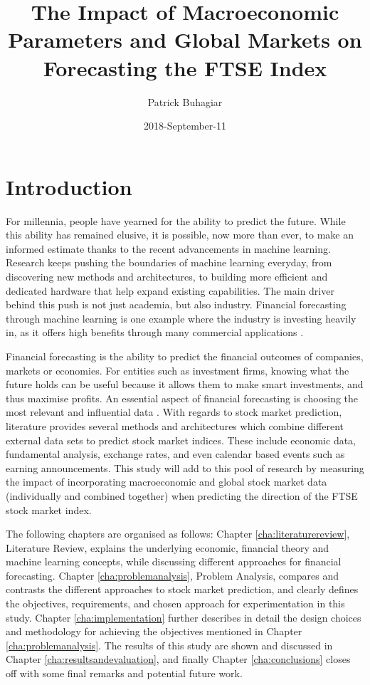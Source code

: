 \documentclass{UoYCSproject}
\author{Patrick Buhagiar}
\title{The Impact of Macroeconomic Parameters and Global Markets on Forecasting the FTSE Index}
\date{2018-September-11}
\begin{document}
\maketitle

\listoffigures
\listoftables

\label{sec:start}
\thispagestyle{empty}\cleardoublepage

\chapter{Introduction}
\label{cha:Introduction}
For millennia, people have yearned for the ability to predict the future. While this ability has remained elusive, it is possible, now more than ever, to make an informed estimate thanks to the recent advancements in machine learning. Research keeps pushing the boundaries of machine learning everyday, from discovering new methods and architectures, to building more efficient and dedicated hardware that help expand existing capabilities. The main driver behind this push is not just academia, but also industry.  Financial forecasting through machine learning is one example where the industry is investing heavily in, as it offers high benefits through many commercial applications \cite{majhi2007stock}.

Financial forecasting is the ability to predict the financial outcomes of companies, markets or economies. For entities such as investment firms, knowing what the future holds can be useful because it allows them to make smart investments, and thus maximise profits. An essential aspect of financial forecasting is choosing the most relevant and influential data \cite{zhong2017forecasting}. With regards to stock market prediction, literature provides several methods and architectures which combine different external data sets to predict stock market indices. These include economic data, fundamental analysis, exchange rates, and even calendar based events such as earning announcements. This study will add to this pool of research by measuring the impact of incorporating macroeconomic and global stock market data (individually and combined together) when predicting the direction of the FTSE stock market index.   

The following chapters are organised as follows: Chapter \ref{cha:literaturereview}, Literature Review, explains the underlying economic, financial theory and machine learning concepts, while discussing different approaches for financial forecasting. Chapter \ref{cha:problemanalysis}, Problem Analysis, compares and contrasts the different approaches to stock market prediction, and clearly defines the objectives, requirements, and chosen approach for experimentation in this study. Chapter \ref{cha:implementation} further describes in detail the design choices and methodology for achieving the objectives mentioned in Chapter \ref{cha:problemanalysis}. The results of this study are shown and discussed in Chapter \ref{cha:resultsandevaluation}, and finally Chapter \ref{cha:conclusions} closes off with some final remarks and potential future work. 
\end{document}
